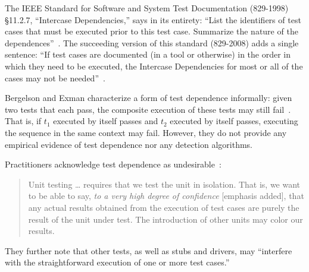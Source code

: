 The IEEE Standard for Software and System Test
Documentation (829-1998) \S 11.2.7, ``Intercase
Dependencies,'' says in its entirety: ``List the identifiers of
test cases that must be executed prior to this test
case. Summarize
the nature of the dependences''~\cite{IEEE:829-1998}.  The succeeding version of this
standard (829-2008) adds a single sentence: ``If
test cases are documented (in a tool or otherwise) in the order in
which they need to be executed, the Intercase Dependencies for most or
all of the cases may not be needed''~\cite{IEEE:829-2008}.





Bergelson and Exman characterize a form of test dependence informally:
given two tests that each pass, the composite
execution of these tests may still
fail~\cite[p.~38]{bergelsonetal:EEE:2006}.  That is, if 
$t_1$ executed by itself passes and $t_2$ executed by itself passes,
executing the sequence  in the same context may fail.
However, they do not provide any empirical evidence of
test dependence nor any detection algorithms.

Practitioners acknowledge test dependence as undesirable~\cite{unit-test-def}:
\vspace{-1mm}
\begin{quote}
Unit testing \dots  
requires that we test the unit in isolation. That is, we
want to be able to say, \emph{to a very high degree of confidence} [emphasis added], that
any actual results obtained from the execution of test cases are
purely the result of the unit under test. The introduction of
other units may color our results.
\end{quote}
\vspace{-1mm}
They further note that other tests, as well as stubs and drivers,
may ``interfere with the straightforward
execution of one or more test cases.''


